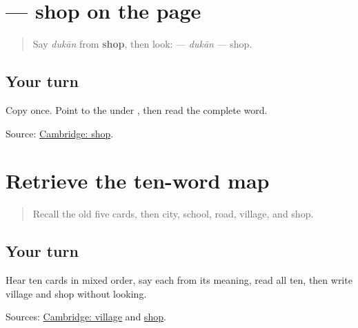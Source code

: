 \section[\texorpdfstring{\gu{દુકાન} (dukān)}{દુકાન (dukān)}]{ — shop on the page}

\label{lesson:GU-C23-dukaan}



\begin{quote}
Say \emph{dukān} from \textbf{shop}, then look: \textbf{} — \emph{dukān} — shop.
\end{quote}

\subsection*{Your turn}

Copy \textbf{} once. Point to the \textbf{} under \textbf{}, then read the complete word.

\begin{tcolorbox}[breakable,colback=teal!4,colframe=teal!35!black,title={Before you move on}]
Source: \href{https://dictionary.cambridge.org/dictionary/english-gujarati/shop}{Cambridge: shop}.
\end{tcolorbox}
\section[\texorpdfstring{\gu{બજાર} — \gu{ઘર} — \gu{મંદિર} … (bajār — ghar …)}{બજાર — ઘર — મંદિર … (bajār — ghar …)}]{Retrieve the ten-word map}

\label{lesson:GU-R23-map-ten}



\begin{quote}
Recall the old five cards, then city, school, road, village, and shop.
\end{quote}

\subsection*{Your turn}
Hear ten cards in mixed order, say each from its meaning, read all ten, then write village and shop without looking.

\begin{tcolorbox}[breakable,colback=teal!4,colframe=teal!35!black,title={Before you move on}]
Sources: \href{https://dictionary.cambridge.org/dictionary/english-gujarati/village}{Cambridge: village} and \href{https://dictionary.cambridge.org/dictionary/english-gujarati/shop}{shop}.
\end{tcolorbox}
